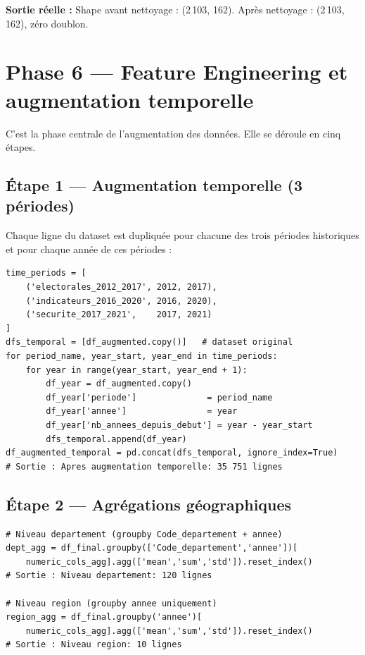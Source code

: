 \documentclass[12pt,a4paper,oneside]{report}
\begin{document}
\textbf{Sortie réelle :} Shape avant nettoyage : (2\,103, 162). Après nettoyage : (2\,103, 162), zéro doublon.

\section{Phase 6 — Feature Engineering et augmentation temporelle}

C'est la phase centrale de l'augmentation des données. Elle se déroule en cinq étapes.

\subsection{Étape 1 — Augmentation temporelle (3 périodes)}

Chaque ligne du dataset est dupliquée pour chacune des trois périodes historiques et pour chaque année de ces périodes :

\begin{lstlisting}[caption={Augmentation temporelle multi-périodes — Phase 6 (sortie réelle)}]
time_periods = [
    ('electorales_2012_2017', 2012, 2017),
    ('indicateurs_2016_2020', 2016, 2020),
    ('securite_2017_2021',    2017, 2021)
]
dfs_temporal = [df_augmented.copy()]   # dataset original
for period_name, year_start, year_end in time_periods:
    for year in range(year_start, year_end + 1):
        df_year = df_augmented.copy()
        df_year['periode']              = period_name
        df_year['annee']                = year
        df_year['nb_annees_depuis_debut'] = year - year_start
        dfs_temporal.append(df_year)
df_augmented_temporal = pd.concat(dfs_temporal, ignore_index=True)
# Sortie : Apres augmentation temporelle: 35 751 lignes
\end{lstlisting}

\subsection{Étape 2 — Agrégations géographiques}

\begin{lstlisting}[caption={Création d'agrégats département et région}]
# Niveau departement (groupby Code_departement + annee)
dept_agg = df_final.groupby(['Code_departement','annee'])[
    numeric_cols_agg].agg(['mean','sum','std']).reset_index()
# Sortie : Niveau departement: 120 lignes

# Niveau region (groupby annee uniquement)
region_agg = df_final.groupby('annee')[
    numeric_cols_agg].agg(['mean','sum','std']).reset_index()
# Sortie : Niveau region: 10 lignes
\end{lstlisting}
\end{document}
